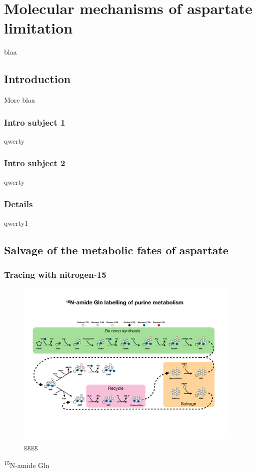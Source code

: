 \chapter{Molecular mechanisms of aspartate limitation}
blaa

\section{Introduction}
More blaa

\subsection{Intro subject 1}
qwerty

\subsection{Intro subject 2}
qwerty
\subsection{Details}
qwerty1



\section{Salvage of the metabolic fates of aspartate}

\subsection{Tracing with nitrogen-15}

\begin{figure}
    \centering
    \includegraphics[width=0.95\textwidth]{figures/chap2/purine_tracing_overvew.pdf}
    \caption[Purine metabolism tracing overview]{gggg}
    \label{fig:ch2:pur_tr_ov}
\end{figure}






\textsuperscript{15}N-amide Gln


